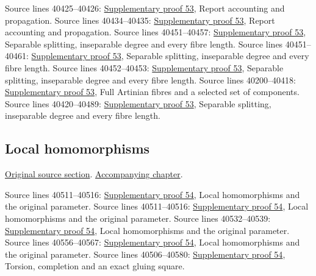 \begin{AlgebraSourceRoutes}
 Source lines 40425--40426: \hyperlink{algebra_etale_quasifinite_notes_20260928}{Supplementary proof 53}, Report accounting and propagation.
 Source lines 40434--40435: \hyperlink{algebra_etale_quasifinite_notes_20260928}{Supplementary proof 53}, Report accounting and propagation.
 Source lines 40451--40457: \hyperlink{algebra_etale_quasifinite_notes_20260928}{Supplementary proof 53}, Separable splitting, inseparable degree and every fibre length.
 Source lines 40451--40461: \hyperlink{algebra_etale_quasifinite_notes_20260928}{Supplementary proof 53}, Separable splitting, inseparable degree and every fibre length.
 Source lines 40452--40453: \hyperlink{algebra_etale_quasifinite_notes_20260928}{Supplementary proof 53}, Separable splitting, inseparable degree and every fibre length.
 Source lines 40200--40418: \hyperlink{algebra_etale_quasifinite_notes_20260928}{Supplementary proof 53}, Full Artinian fibres and a selected set of components.
 Source lines 40420--40489: \hyperlink{algebra_etale_quasifinite_notes_20260928}{Supplementary proof 53}, Separable splitting, inseparable degree and every fibre length.
\end{AlgebraSourceRoutes}

\subsection{Local homomorphisms}
\hypertarget{algebra-source-section-local-homomorphisms}{}
\noindent\href{https://github.com/stacks/stacks-project/blob/a04446e57ec1fbc252a871afcec7752fb2807b14/algebra.tex\#L40497}{Original source section}. \href{algebra.pdf\#nameddest=section-local-homomorphisms}{Accompanying chapter}.

\begin{AlgebraSourceRoutes}
 Source lines 40511--40516: \hyperlink{algebra_local_integral_notes_20260928}{Supplementary proof 54}, Local homomorphisms and the original parameter.
 Source lines 40511--40516: \hyperlink{algebra_local_integral_notes_20260928}{Supplementary proof 54}, Local homomorphisms and the original parameter.
 Source lines 40532--40539: \hyperlink{algebra_local_integral_notes_20260928}{Supplementary proof 54}, Local homomorphisms and the original parameter.
 Source lines 40556--40567: \hyperlink{algebra_local_integral_notes_20260928}{Supplementary proof 54}, Local homomorphisms and the original parameter.
 Source lines 40506--40580: \hyperlink{algebra_local_integral_notes_20260928}{Supplementary proof 54}, Torsion, completion and an exact gluing square.
\end{AlgebraSourceRoutes}

